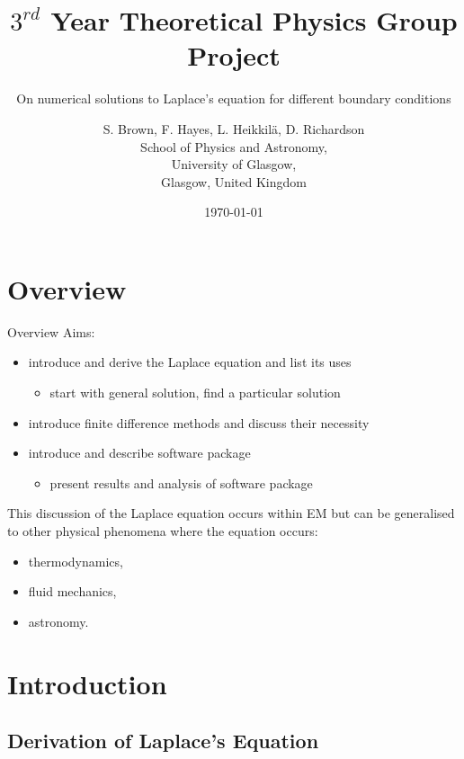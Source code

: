 \documentclass{beamer}
\title{$3^{rd}$ Year Theoretical Physics Group Project}
\subtitle{On numerical solutions to Laplace's equation for different boundary conditions}
\author{S. Brown, F. Hayes, L. Heikkil{\"a}, D. Richardson\\
        School of Physics and Astronomy,\\
        University of Glasgow,\\
        Glasgow, United Kingdom}
\date{\today}
\begin{document}

\begin{frame} 
\titlepage
\end{frame}

\begin{frame}
\tableofcontents
\end{frame}

\section{Overview}
\begin{frame}{Overview}
Aims:
\begin{itemize}
\item introduce and derive the Laplace equation and list its uses
 \begin{itemize}
 \item start with general solution, find a particular solution
 \end{itemize}
\item introduce finite difference methods and discuss their necessity
\item introduce and describe software package 
 \begin{itemize}
 \item present results and analysis of software package
 \end{itemize}
\end{itemize}

This discussion of the Laplace equation occurs within EM but can
be generalised to other physical phenomena where the equation occurs:
\begin{itemize}
\item thermodynamics,
\item fluid mechanics,
\item astronomy.
\end{itemize}
\end{frame}

\section{Introduction}
\subsection{Derivation of Laplace's Equation}
\end{document}
